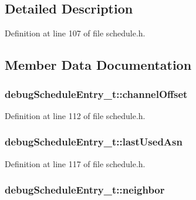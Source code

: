 \subsection{Detailed Description}


Definition at line 107 of file schedule.\+h.



\subsection{Member Data Documentation}
\subsubsection[{\texorpdfstring{channel\+Offset}{channelOffset}}]{ debug\+Schedule\+Entry\+\_\+t\+::channel\+Offset}\hypertarget{structdebug_schedule_entry__t_a753bd0142c40e6fe63e1aae2e2ff201b}{}\label{structdebug_schedule_entry__t_a753bd0142c40e6fe63e1aae2e2ff201b}


Definition at line 112 of file schedule.\+h.

\subsubsection[{\texorpdfstring{last\+Used\+Asn}{lastUsedAsn}}]{ debug\+Schedule\+Entry\+\_\+t\+::last\+Used\+Asn}\hypertarget{structdebug_schedule_entry__t_a7162d1d1b4e7b8c899b2d082eb49da16}{}\label{structdebug_schedule_entry__t_a7162d1d1b4e7b8c899b2d082eb49da16}


Definition at line 117 of file schedule.\+h.

\subsubsection[{\texorpdfstring{neighbor}{neighbor}}]{ debug\+Schedule\+Entry\+\_\+t\+::neighbor}\hypertarget{structdebug_schedule_entry__t_ac7937ec3d5e713dd63f9c68e2bea84ce}{}\label{structdebug_schedule_entry__t_ac7937ec3d5e713dd63f9c68e2bea84ce}


